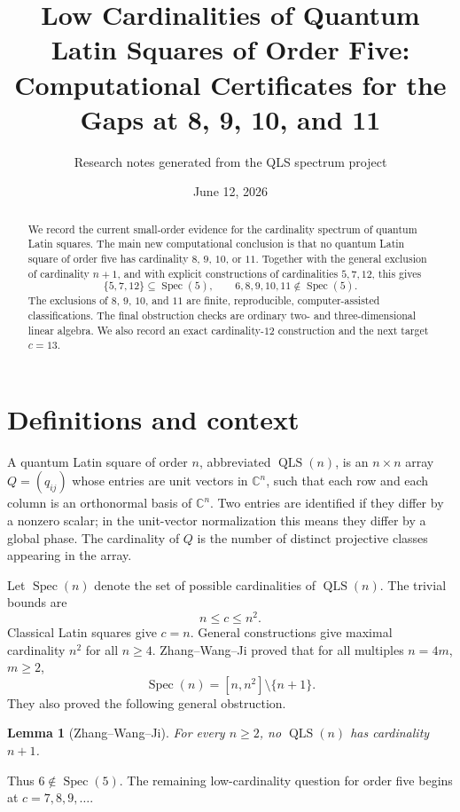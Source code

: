 \documentclass[11pt]{article}
\title{Low Cardinalities of Quantum Latin Squares of Order Five:\\
Computational Certificates for the Gaps at 8, 9, 10, and 11}
\author{Research notes generated from the QLS spectrum project}
\date{June 12, 2026}
\newtheorem{lemma}{Lemma}
\newcommand{\C}{\mathbb{C}}
\newcommand{\Spec}{\operatorname{Spec}}
\newcommand{\QLS}{\operatorname{QLS}}
\begin{document}
\maketitle

\begin{abstract}
We record the current small-order evidence for the cardinality spectrum of
quantum Latin squares.  The main new computational conclusion is that no
quantum Latin square of order five has cardinality \(8\), \(9\), \(10\), or
\(11\).  Together
with the general exclusion of cardinality \(n+1\), and with explicit
constructions of cardinalities \(5,7,12\), this gives
\[
  \{5,7,12\}\subseteq \Spec(5),\qquad
  6,8,9,10,11\notin \Spec(5).
\]
The exclusions of \(8\), \(9\), \(10\), and \(11\) are finite, reproducible,
computer-assisted classifications.  The final obstruction checks are ordinary
two- and three-dimensional linear algebra.  We also record an exact
cardinality-\(12\) construction and the next target \(c=13\).
\end{abstract}

\section{Definitions and context}

A quantum Latin square of order \(n\), abbreviated \(\QLS(n)\), is an
\(n\times n\) array \(Q=(q_{ij})\) whose entries are unit vectors in
\(\C^n\), such that each row and each column is an orthonormal basis of
\(\C^n\).  Two entries are identified if they differ by a nonzero scalar; in
the unit-vector normalization this means they differ by a global phase.  The
cardinality of \(Q\) is the number of distinct projective classes appearing in
the array.

Let \(\Spec(n)\) denote the set of possible cardinalities of \(\QLS(n)\).
The trivial bounds are
\[
  n \le c \le n^2.
\]
Classical Latin squares give \(c=n\).  General constructions give
maximal cardinality \(n^2\) for all \(n\ge 4\).  Zhang--Wang--Ji proved that
for all multiples \(n=4m\), \(m\ge 2\),
\[
  \Spec(n)=[n,n^2]\setminus\{n+1\}.
\]
They also proved the following general obstruction.

\begin{lemma}[Zhang--Wang--Ji]
For every \(n\ge 2\), no \(\QLS(n)\) has cardinality \(n+1\).
\end{lemma}

Thus \(6\notin\Spec(5)\).  The remaining low-cardinality question for order
five begins at \(c=7,8,9,\ldots\).
\end{document}
